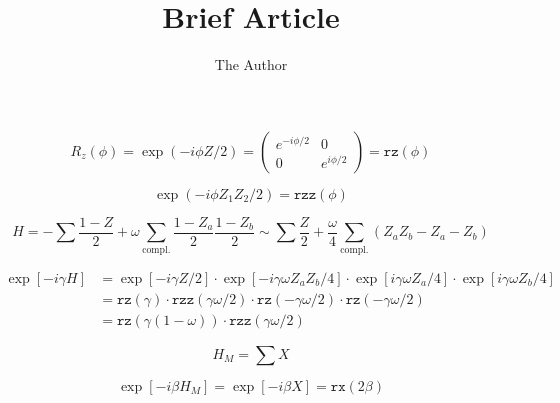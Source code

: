 \documentclass[11pt, oneside]{article}   	%
\title{Brief Article}
\author{The Author}
\begin{document}


\begin{equation}
R_z(\phi) = \exp(-i \phi Z/2) = \begin{pmatrix}
e^{-i \phi / 2} & 0 \\
0 & e^{i \phi /2}
\end{pmatrix} = \mathtt{rz}(\phi)
\end{equation}


\begin{equation}
\exp(-i \phi Z_1 Z_2 / 2) = \mathtt{rzz}(\phi)
\end{equation}



\begin{equation}
H = -\sum\frac{1- Z}{2} + \omega \sum_{\text{compl.}}\frac{1- Z_a}{2} \frac{1- Z_b}{2} \sim\sum\frac{Z}{2} + \frac{\omega}{4} \sum_{\text{compl.}} ( Z_a Z_b - Z_a - Z_b)
\end{equation}


\begin{equation}
\begin{split}
\exp [-i \gamma H] &=\exp [-i \gamma Z / 2]  \cdot \exp [-i \gamma\omega Z_a Z_b / 4] \cdot \exp [i \gamma\omega Z_a / 4] \cdot \exp [i \gamma\omega Z_b / 4] \\
&=\mathtt{rz}(\gamma) \cdot  \mathtt{rzz}(\gamma\omega /2) \cdot\mathtt{rz}(-\gamma\omega / 2)\cdot\mathtt{rz}(-\gamma\omega/2) \\
&=\mathtt{rz}(\gamma(1-\omega)) \cdot  \mathtt{rzz}(\gamma\omega /2)
\end{split}
\end{equation}


\bigskip

\begin{equation}
H_M = \sum X
\end{equation}


\begin{equation}
\exp[-i \beta H_M] = \exp[-i \beta X  ] = \mathtt{rx}(2\beta)
\end{equation}
\end{document}
